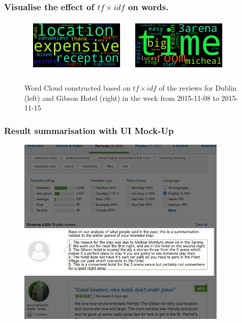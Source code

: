 \documentclass[xetex,mathserif,serif]{beamer}
\begin{document}
\begin{frame}
	\frametitle{Visualise the effect of $tf\times idf$ on words.}
\begin{figure}[h]
\centering
\fboxsep 0mm
\includegraphics[width=5.2cm]{all_2015_11_08_week}
\includegraphics[width=5.2cm]{gibson_2015_11_08_week}

\caption{Word Cloud constructed based on $tf\times idf$ of the reviews for  Dublin (left) and Gibson Hotel (right) in the week from 2015-11-08 to 2015-11-15}

\end{figure}

\end{frame}


\begin{frame}
	\frametitle{Result summarisation with UI Mock-Up}
	\begin{figure}[h]
	\centering
	\fboxsep 0mm
	
	\includegraphics[width=10cm]{ts-3}

	\end{figure}
\end{frame}
\end{document}
